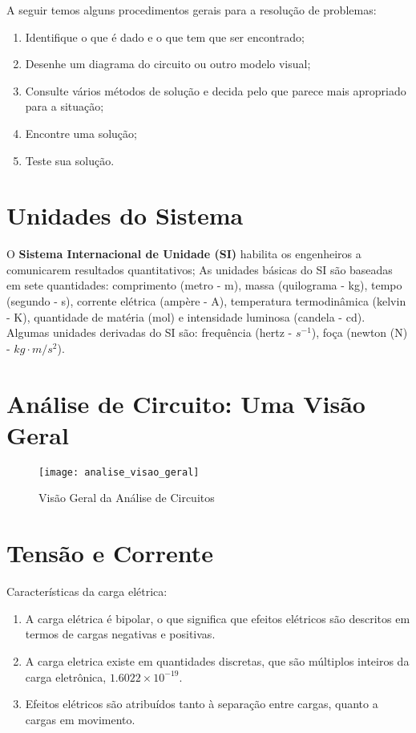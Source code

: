 A seguir temos alguns procedimentos gerais para a resolução de problemas:
\begin{enumerate}
 \item Identifique o que é dado e o que tem que ser encontrado;
 \item Desenhe um diagrama do circuito ou outro modelo visual;
 \item Consulte vários métodos de solução e decida pelo que parece mais apropriado para a situação;
 \item Encontre uma solução;
 \item Teste sua solução.
\end{enumerate}

\section{Unidades do Sistema}

O \textbf{Sistema Internacional de Unidade (SI)} habilita os engenheiros a comunicarem resultados quantitativos; As unidades básicas do SI são baseadas em sete quantidades: comprimento (metro - m), massa (quilograma - kg), tempo (segundo - s), corrente elétrica (ampère - A), temperatura termodinâmica (kelvin - K), quantidade de matéria (mol) e intensidade luminosa (candela - cd). Algumas unidades derivadas do SI são: frequência (hertz - $s^{-1}$), foça (newton (N) - $kg \cdot m/s^{2}$).

\section{Análise de Circuito: Uma Visão Geral}

\begin{figure}[h]
\centering\texttt{[image: analise\_visao\_geral]}
\caption{Visão Geral da Análise de Circuitos}
\end{figure}

\section{Tensão e Corrente}

Características da carga elétrica:
\begin{enumerate}
\item A carga elétrica é bipolar, o que significa que efeitos elétricos são descritos em termos de cargas negativas e positivas.
\item A carga eletrica existe em quantidades discretas, que são múltiplos inteiros da carga eletrônica, $1.6022 \times 10^{-19}$.
\item Efeitos elétricos são atribuídos tanto à separação entre cargas, quanto a cargas em movimento.
\end{enumerate}


